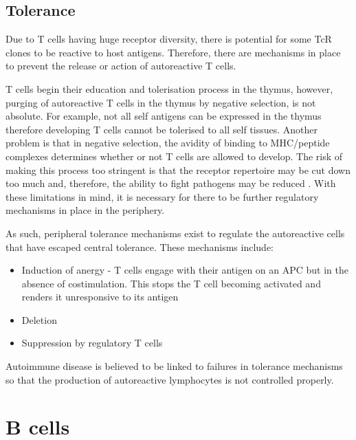 




\subsection{Tolerance}
\label{subsec:Tcelltolerance}

Due to T cells having huge receptor diversity, there is potential for some TcR clones to be reactive to host antigens.
Therefore, there are mechanisms in place to prevent the release or action of autoreactive T cells.

T cells begin their education and tolerisation process in the thymus, however, purging of autoreactive T cells in the thymus by negative selection, is not absolute.
For example, not all self antigens can be expressed in the thymus therefore developing T cells cannot be tolerised to all self tissues.
Another problem is that in negative selection, the avidity of binding to MHC/peptide complexes determines whether or not T cells are allowed to develop.
The risk of making this process too stringent is that the receptor repertoire may be cut down too much and, therefore, the ability to fight pathogens may be reduced \citep{Walker2002}.
With these limitations in mind, it is necessary for there to be further regulatory mechanisms in place in the periphery.

As such, peripheral tolerance mechanisms exist to regulate the autoreactive cells that have escaped central tolerance.
These mechanisms include:
\begin{itemize}
\item Induction of anergy - T cells engage with their antigen on an APC but in the absence of costimulation. This stops the T cell becoming activated and renders it unresponsive to its antigen \citep{Abbas2004}
\item Deletion \citep{Abbas2004}
\item Suppression by regulatory T cells \citep{Abbas2004}
\end{itemize}

Autoimmune disease is believed to be linked to failures in tolerance mechanisms so that the production of autoreactive lymphocytes is not controlled properly.

\section{B cells}
\label{sec:Bcells}

